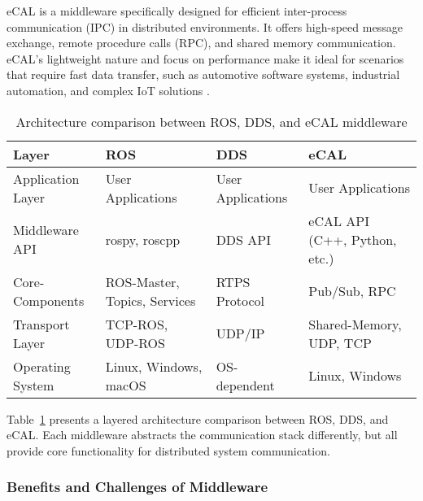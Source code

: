 eCAL is a middleware specifically designed for efficient inter-process communication (IPC) in distributed environments. It offers high-speed message exchange, remote procedure calls (RPC), and shared memory communication. eCAL's lightweight nature and focus on performance make it ideal for scenarios that require fast data transfer, such as automotive software systems, industrial automation, and complex IoT solutions \cite{ecal_github}.
\\
\begin{table}[H]
	\centering
	\renewcommand{\arraystretch}{1.5}
	\begin{tabular}{|p{2.25cm}|p{3.22cm}|p{3.22cm}|p{3.22cm}|}
		\hline
		\textbf{Layer} & \textbf{ROS} & \textbf{DDS} & \textbf{eCAL} \\
		\hline
		Application Layer & User Applications & User Applications & User Applications \\
		\hline
		Middleware API & rospy, roscpp & DDS API & eCAL API (C++, Python, etc.) \\
		\hline
		Core-Components & ROS-Master, Topics, Services & RTPS Protocol & Pub/Sub, RPC \\
		\hline
		Transport Layer & TCP-ROS, UDP-ROS & UDP/IP & Shared-Memory, UDP, TCP \\
		\hline
		Operating System & Linux, Windows, macOS & OS-dependent & Linux, Windows \\
		\hline
	\end{tabular}
	\caption{Architecture comparison between ROS, DDS, and eCAL middleware}
	\label{tab:middleware_comparison}
\end{table}

Table~\ref{tab:middleware_comparison} presents a layered architecture comparison between ROS, DDS, and eCAL. Each middleware abstracts the communication stack differently, but all provide core functionality for distributed system communication.
\\

\subsubsection{Benefits and Challenges of Middleware}

